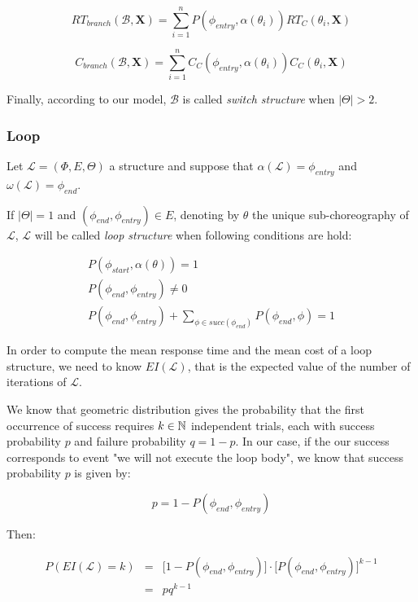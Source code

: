 \begin{equation}
	RT_{branch}(\mathcal{B}, \textbf{X}) = \sum_{i = 1}^n P(\phi_{entry}, \alpha(\theta_i)) RT_C(\theta_i, \textbf{X})
\end{equation}

\begin{equation}
	C_{branch}(\mathcal{B}, \textbf{X}) = \sum_{i = 1}^n C_C(\phi_{entry}, \alpha(\theta_i)) C_C(\theta_i, \textbf{X})
\end{equation}

Finally, according to our model, $\mathcal{B}$ is called \textit{switch structure} when $|\Theta| > 2$.

\subsubsection{Loop}

Let $\mathcal{L} = (\Phi,E,\Theta)$ a structure and suppose that $\alpha(\mathcal{L}) = \phi_{entry}$ and $\omega(\mathcal{L}) = \phi_{end}$. 

If $|\Theta| = 1$ and $(\phi_{end}, \phi_{entry}) \in E$, denoting by $\theta$ the unique sub-choreography of $\mathcal{L}$, $\mathcal{L}$ will be called \textit{loop structure} when following conditions are hold:

\begin{eqnarray}
	P(\phi_{start}, \alpha(\theta)) = 1 \\
	P(\phi_{end}, \phi_{entry}) \neq 0 \\
	P(\phi_{end}, \phi_{entry}) + \sum_{\phi \in succ(\phi_{end})} P(\phi_{end}, \phi) = 1
\end{eqnarray}

In order to compute the mean response time and the mean cost of a loop structure, we need to know $EI(\mathcal{L})$, that is the expected value of the number of iterations of $\mathcal{L}$.

We know that geometric distribution gives the probability that the first occurrence of success requires $k \in \mathbb{N}$ independent trials, each with success probability $p$ and failure probability $q = 1 - p$. In our case, if the our success corresponds to event "we will not execute the loop body", we know that success probability $p$ is given by:

\begin{equation}
	p = 1 - P(\phi_{end}, \phi_{entry})
\end{equation}

Then:

\begin{eqnarray}
	P(EI(\mathcal{L}) = k) & = & \Big[  1 - P(\phi_{end}, \phi_{entry}) \Big] \cdot \bigg[  P(\phi_{end}, \phi_{entry}) \bigg] ^{k-1} \\
	& = & pq^{k-1}
\end{eqnarray}

